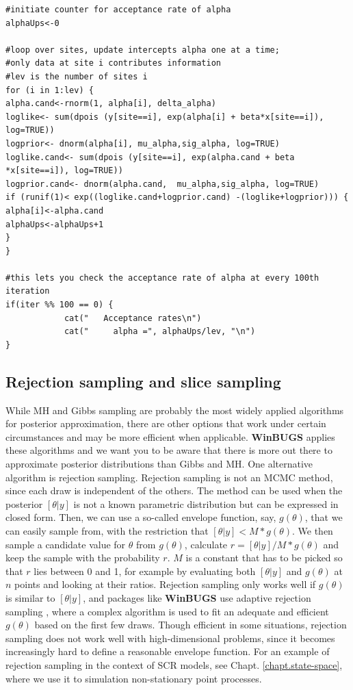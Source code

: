 {\small
\begin{verbatim}
#initiate counter for acceptance rate of alpha
alphaUps<-0

#loop over sites, update intercepts alpha one at a time; 
#only data at site i contributes information			
#lev is the number of sites i
for (i in 1:lev) { 		
alpha.cand<-rnorm(1, alpha[i], delta_alpha)	
loglike<- sum(dpois (y[site==i], exp(alpha[i] + beta*x[site==i]), log=TRUE))  
logprior<- dnorm(alpha[i], mu_alpha,sig_alpha, log=TRUE)
loglike.cand<- sum(dpois (y[site==i], exp(alpha.cand + beta *x[site==i]), log=TRUE))
logprior.cand<- dnorm(alpha.cand,  mu_alpha,sig_alpha, log=TRUE)
if (runif(1)< exp((loglike.cand+logprior.cand) -(loglike+logprior))) {
alpha[i]<-alpha.cand
alphaUps<-alphaUps+1
}
}

#this lets you check the acceptance rate of alpha at every 100th iteration
if(iter %% 100 == 0) {  
            cat("   Acceptance rates\n")
            cat("     alpha =", alphaUps/lev, "\n")
}
\end{verbatim}
}

\subsection{Rejection sampling and slice sampling }

While MH and Gibbs sampling are probably the most widely applied
algorithms for posterior approximation, there are other options that
work under certain circumstances and may be more efficient when
applicable. {\bf WinBUGS} applies these algorithms and we want you to be
aware that there is more out there to approximate posterior
distributions than Gibbs and MH.  One alternative algorithm is
rejection sampling. Rejection sampling is not an MCMC method, since
each draw is independent of the others. The method can be used when
the posterior $[\theta|y]$ is not a known parametric distribution but
can be expressed in closed form. Then, we can use a so-called envelope
function, say, $g(\theta)$, that we can easily sample from, with the
restriction that $[\theta|y] < M * g(\theta)$. We then sample a
candidate value for $\theta$ from $g(\theta)$, calculate $r =
[\theta|y]/M*g(\theta)$ and keep the sample with the probability
$r$. $M$ is a constant that has to be picked so that $r$ lies between
0 and 1, for example by evaluating both $[\theta|y]$ and $g(\theta)$
at $n$ points and looking at their ratios. Rejection sampling only
works well if $g(\theta)$ is similar to $[\theta|y]$, and packages
like {\bf WinBUGS} use adaptive rejection sampling \citep{gilks_wild:1992},
where a complex algorithm is used to fit an adequate and efficient
$g(\theta)$ based on the first few draws. 
Though efficient in some
situations, rejection sampling does not work well with
high-dimensional problems, since it becomes increasingly hard to
define a reasonable envelope function. For an example of rejection
sampling in the context of SCR models, see
Chapt. \ref{chapt.state-space}, where we use it to simulation
non-stationary point processes.  

